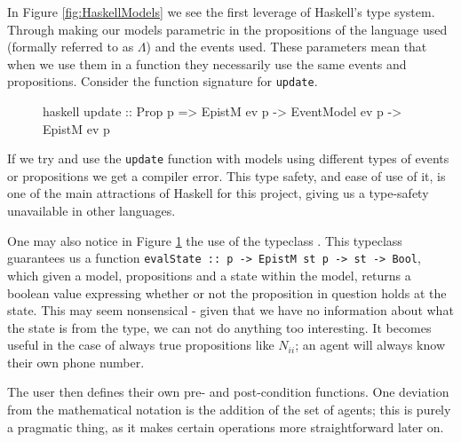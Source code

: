 \documentclass[10pt, a4paper]{report}
\begin{document}
In Figure \ref{fig:HaskellModels} we see the first leverage of Haskell's type
system. Through making our models parametric in the propositions of the language
used (formally referred to as $\Lambda$) and the events used. These parameters
mean that when we use them in a function they necessarily use the same events
and propositions. Consider the function signature for \texttt{update}.

\begin{figure}[h]
  \centering
  \begin{cminted}{haskell}
    update :: Prop p => EpistM ev p -> EventModel ev p -> EpistM ev p
\end{cminted}
  \caption{}
  \label{fig:UpdateType}
\end{figure}

If we try and use the \texttt{update} function with models using
different types of events or propositions we get a compiler error. This type
safety, and ease of use of it, is one of the main attractions of Haskell for
this project, giving us a type-safety unavailable in other languages. 

One may also notice in Figure \ref{fig:UpdateType} the use of the typeclass
. This typeclass guarantees us a function
\texttt{evalState :: p -> EpistM st p -> st -> Bool}, which given a
model, propositions and a state within the model, returns a boolean value
expressing whether or not the proposition in question holds at the state. This
may seem nonsensical - given that we have no information about what the state is
from the type, we can not do anything too interesting. It becomes useful in the
case of always true propositions like $N_{ii}$; an agent will always know
their own phone number.

The user then defines their own \textsf{pre}- and \textsf{post}-condition
functions. One deviation from the mathematical notation is the addition of the
set of agents; this is purely a pragmatic thing, as it makes certain operations
more straightforward later on.
\end{document}
